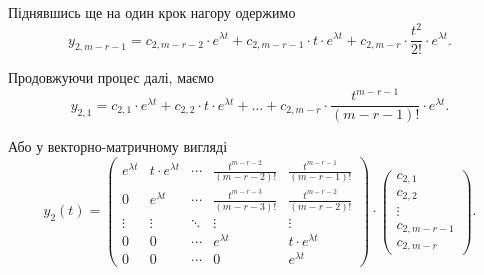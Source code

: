 \begin{enumerate}
Піднявшись ще на один крок нагору одержимо
\begin{equation*}
	y_{2, m - r - 1} = c_{2, m - r - 2} \cdot e^{\lambda t} + c_{2, m - r - 1} \cdot t \cdot e^{\lambda t} + c_{2, m - r } \cdot \frac{t^2}{2!} \cdot e^{\lambda t}.
\end{equation*}

Продовжуючи процес далі, маємо
\begin{equation*}
	y_{2, 1} = c_{2, 1} \cdot e^{\lambda t} + c_{2, 2} \cdot t \cdot e^{\lambda t} + \ldots + c_{2, m - r} \cdot \frac{t^{m - r - 1}}{(m - r - 1)!} \cdot e^{\lambda t}.
\end{equation*}

Або у векторно-матричному вигляді
\begin{equation*}
	y_2(t) = 
	\begin{pmatrix}
		e^{\lambda t} & t \cdot e^{\lambda t} & \cdots & \frac{t^{m - r - 2}}{(m - r - 2)!} & \frac{t^{m - r - 1}}{(m - r - 1)!} \\
		0 & e^{\lambda t} & \cdots & \frac{t^{m - r - 3}}{(m - r - 3)!} & \frac{t^{m - r - 2}}{(m - r - 2)!} \\
		\vdots & \vdots & \ddots & \vdots & \vdots \\
		0 & 0 & \cdots & e^{\lambda t} & t \cdot e^{\lambda t} \\
		0 & 0 & \cdots & 0 & e^{\lambda t}
	\end{pmatrix} \cdot
	\begin{pmatrix} c_{2,1} \\ c_{2,2} \\ \vdots \\ c_{2,m-r-1} \\ c_{2,m-r} \end{pmatrix}.
\end{equation*}


\end{enumerate}
